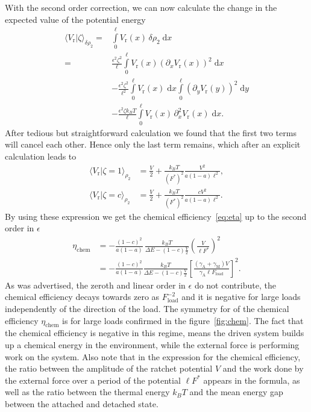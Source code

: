 \documentclass[aps,pre,twocolumn,showpacs,showkeys,superscriptaddress,floatfix]{revtex4-1}
\newcommand{\rmd}{{\mathrm d}}
\begin{document}
With the second order correction, we can now calculate the change in the expected value of the potential energy
\begin{align*}
\langle V_\text{r} | \zeta \rangle_{\delta\rho_2} 
=& \int\limits_0^\ell V_\text{r}(x) \, \delta\rho_2 \; \rmd x \\
=& \frac{\epsilon^2 \zeta^2}{\ell} \int\limits_0^\ell V_\text{r}(x) \left(\partial_x V_\text{r}(x) \right)^2 \; \rmd x  \\
&- \frac{\epsilon^2 \zeta^2}{\ell^2} \int\limits_0^\ell V_\text{r}(x) \; \rmd x \int\limits_0^\ell \left( \partial_y V_\text{r}(y) \right)^2 \; \rmd y \\
&- \frac{\epsilon^2 \zeta k_B T}{\ell} \int\limits_0^\ell V_\text{r}(x) \, \partial_x^2 V_\text{r}(x) \; \rmd x .
\end{align*}
After tedious but straightforward calculation we found that the first two terms will cancel each other. 
Hence only the last term remains, which after an explicit calculation leads to  
\begin{align*}
\langle V_\text{r} | \zeta = 1 \rangle_{\rho_2} &= \frac{V}{2} + \frac{k_B T}{(F^*)^2} \frac{V^2}{a \left(1-a\right) \ell^2 }, \\
\langle V_\text{r} | \zeta = c \rangle_{\rho_2} &= \frac{V}{2} + \frac{k_B T}{(F^*)^2} \frac{c V^2}{a \left(1-a\right) \ell^2 } .
\end{align*}
By using these expression we get the chemical efficiency~\eqref{eq:eta} up to the second order in $\epsilon$  
\begin{align*}
\eta_\text{chem} 
&= - \frac{ \left(1-c\right)^2 }{ a (1-a) } \, \frac{k_B T} { \Delta E - (1-c) \frac{V}{2} } \left( \frac{V}{\ell F^*} \right)^2 
\\
&= - \frac{ \left(1-c\right)^2 }{ a (1-a) } 
\frac{k_B T} { \Delta E - (1-c) \frac{V}{2} } 
\left[ \frac{ ( \gamma_\text{A} + \gamma_\text{M} ) V }{\gamma_\text{A} \ell F_\text{load}} \right]^2 .
\end{align*}
As was advertised, the zeroth and linear order in $\epsilon$ do not contribute, 
the chemical efficiency decays towards zero as $F_\text{load}^{-2}$ and it is negative for large loads independently of the direction of the load.
The symmetry for of the chemical efficiency $\eta_\text{chem}$ is for large loads confirmed in the figure~\ref{fig:chem}. 
The fact that the chemical efficiency is negative in this regime, 
means the driven system builds up a chemical energy in the environment, while the external force is performing work on the system. 
Also note that in the expression for the chemical efficiency, 
the ratio between the amplitude of the ratchet potential $V$ and the work done by the external force over a period of the potential $\ell F^*$ appears in the formula, 
as well as the ratio between the thermal energy $k_B T$ and the mean energy gap between the attached and detached state. 
\end{document}
